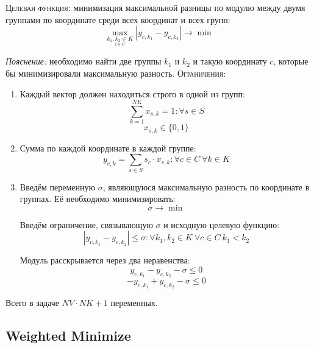 \documentclass[%
10pt, %
final, %
oneside, %
onecolumn, %
centertags]{article} %
\theoremstyle{plain}
\theoremstyle{definition}
\theoremstyle{remark}
\begin{document}
\textsc{Целевая функция:} минимизация максимальной разницы по модулю между двумя группами по координате среди всех координат и всех групп:
$$\underset{\underset{c\in C}{k_1,k_2\in K}}{\max} \left \vert y_{c,k_1} - y_{c,k_2} \right \vert \to \min$$

\textit{Пояснение:} необходимо найти две группы $k_1$ и $k_2$ и такую координату $c$, которые бы минимизировали максимальную разность.
\newpage
\textsc{Ограничения}:

\begin{enumerate}
	\item Каждый вектор должен находиться строго в одной из групп: 
	$$\sum\limits_{k=1}^{NK}x_{s,k} = 1 : \forall s \in S$$
	$$x_{s,k} \in \{0,1\}$$
	\item Сумма по каждой координате в каждой группе:
	$$y_{c,k} = \sum\limits_{s\in S} s_c \cdot x_{s,k}: \forall c \in C \  \forall k \in K$$
	\item Введём переменную $\sigma$, являющуюся максимальную разность по координате в группах. Её необходимо минимизировать:
	$$\sigma \to \min$$

	Введём ограничение, связывающую $\sigma$ и исходную целевую функцию:
	$$\left\vert y_{c,k_1} - y_{c,k_2} \right\vert \leq \sigma : \forall k_1,k_2 \in K \ \forall c \in C \ k_1 < k_2$$

	Модуль расскрывается через два неравенства:
	$$y_{c,k_1} - y_{c,k_2} - \sigma \leq 0$$
	$$-y_{c,k_1} + y_{c,k_2} - \sigma \leq 0$$ 
\end{enumerate}

Всего в задаче $NV\cdot NK + 1$ переменных.

\newpage

\subsection{Weighted Minimize}
\end{document}
